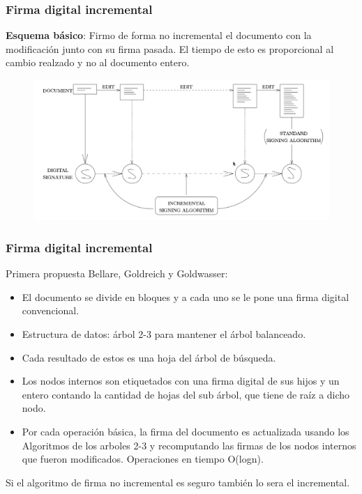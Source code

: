 \documentclass[10pt,handout]{beamer}
\begin{document}
\begin{frame}
\frametitle{Firma digital incremental}

\textbf{Esquema básico}: Firmo de forma no incremental el documento con la modificación junto con su firma pasada.
El tiempo de esto es proporcional al cambio realzado y no al documento entero.

\begin{figure}[h!]
    \centering
    \includegraphics[scale=0.25]{firma.jpg}
\end{figure}


\end{frame}


\begin{frame}
\frametitle{Firma digital incremental}

Primera propuesta Bellare, Goldreich y Goldwasser:
\begin{itemize}\itemsep-1em
  \item El documento se divide en bloques y a cada uno se le pone una firma digital convencional.
\pause
\item Estructura de datos: árbol 2-3 para mantener el árbol balanceado.
  \item  Cada resultado de estos es una hoja del árbol de búsqueda.
\pause
  \item Los nodos internos son etiquetados con una firma digital de sus hijos y un entero contando
la cantidad de hojas del sub árbol, que tiene de raíz a dicho nodo.
\item Por cada operación básica, la firma del documento es actualizada usando los Algoritmos
de los arboles 2-3 y recomputando las firmas de los nodos internos que fueron modificados.
Operaciones en tiempo O(logn).
\end{itemize}


\pause
Si el algoritmo de firma no incremental es seguro también lo sera el incremental.

\end{frame}
\end{document}
